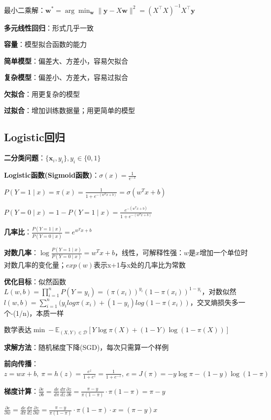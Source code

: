 	最小二乘解：$\mathbf{w}^* = \arg\min_{\mathbf{w}} \lVert \mathbf{y} - X\mathbf{w} \rVert^2 = (X^\top X)^{-1} X^\top \mathbf{y}$
	
	\textbf{多元线性回归}：形式几乎一致
	
	\textbf{容量}：模型拟合函数的能力
	
	\textbf{简单模型}：偏差大、方差小，容易欠拟合
	
	\textbf{复杂模型}：偏差小、方差大，容易过拟合
	
	\textbf{欠拟合}：用更复杂的模型
	
	\textbf{过拟合}：增加训练数据量；用更简单的模型
	
	\subsection*{Logistic回归}
	
	\textbf{二分类问题}：$\{\mathbf{x}_i, y_i\}, y_i \in \{0, 1\}$
	
	\textbf{Logistic函数(Sigmoid函数)}：$\sigma(x) = \frac{1}{e^{-x}}$
	
	$P(Y=1 \mid x) = \pi(x) = \frac{1}{1 + e^{-(w^T x + b)}} = \sigma(w^T x + b)$
	
	$P(Y=0 \mid x) = 1 - P(Y=1 \mid x) = \frac{e^{-(w^T x + b)}}{1 + e^{-(w^T x + b)}}$
	
	\textbf{几率比}：$\frac{P(Y=1 \mid x)}{P(Y=0 \mid x)} = e^{w^T x + b}$
	
	\textbf{对数几率}：$\log \frac{P(Y=1 \mid x)}{P(Y=0 \mid x)} = w^T x + b$，线性，可解释性强：$w$是$x$增加一个单位时对数几率的变化量；$exp(w)$表示x+1与x处的几率比为常数
	
	\textbf{优化目标}：似然函数$	L(w, b) = \prod_{i=1}^n P(Y=y_i) = (\pi(x_i))^{y_i}(1-\pi(x_i))^{1-y_i}$，对数似然$l(w,b)=\sum_{i=1}^{n}(y_i log \pi(x_i)+(1-y_i)log(1-\pi(x_i))$，交叉熵损失多一个-(1/n)，本质一样
	
	数学表达$\min - \mathbb{E}_{(X,Y) \in \mathcal{D}} \left[ Y \log \pi(X) + (1 - Y) \log(1 - \pi(X)) \right]$
	
	\textbf{求解方法}：随机梯度下降(SGD)，每次只需算一个样例
	
	\textbf{前向传播}：$z = w x + b,~\pi = h(z) = \frac{e^{z}}{1 + e^{z}} = \frac{1}{1 + e^{-z}}, ~e = J(\pi) = -y \log \pi - (1 - y) \log(1 - \pi)$
	
	\textbf{梯度计算}：$\frac{\partial e}{\partial b} = \frac{de}{d\pi} \frac{d\pi}{dz} \frac{\partial z}{\partial b} = \frac{\pi - y}{\pi(1 - \pi)} \cdot \pi(1 - \pi) = \pi - y$
	
	$\frac{\partial e}{\partial w} = \frac{de}{d\pi} \frac{d\pi}{dz} \frac{\partial z}{\partial w} = \frac{\pi - y}{\pi(1 - \pi)} \cdot \pi(1 - \pi) \cdot x = (\pi - y)x$
	

